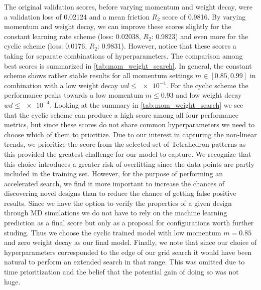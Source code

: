 The original validation scores, before varying momentum and weight decay, were a
validation loss of 0.02124 and a mean friction $R_2$ score of 0.9816. By varying
momentum and weight decay, we can improve these scores slightly for the constant
learning rate scheme (loss: 0.02038, $R_2$: 0.9823) and even more for the cyclic
scheme (loss: 0.0176, $R_2$: 0.9831). However, notice that these scores a taking
for separate combinations of hyperparameters. The comparison among best scores is
summarized in \cref{tab:mom_weight_search}. In general, the constant scheme
shows rather stable results for all momentum settings $m \in [0.85, 0.99]$ in
combination with a low weight decay $wd \le \num{e-4}$. For the cyclic scheme
the performance peaks towards a low momentum $m \le 0.93$ and low weight decay
$wd \le \num{e-4}$. Looking at the summary in \cref{tab:mom_weight_search} we
see that the cyclic scheme can produce a high score among all four
performance metrics, but since these scores do not share common hyperparameters we need to choose which of them to prioritize. Due to our interest in capturing the non-linear trends, we prioritize the score from the
selected set of Tetrahedron patterns as this provided the greatest challenge for our model to capture. We recognize that this choice introduces a greater risk of
overfitting since the data points are partly included in the training set. However, for the purpose of performing an accelerated search, we find it more important to increase the chances of discovering novel designs than to reduce the chance of getting false positive results. Since we have the option to verify the properties of a given design through \acrshort{MD} simulations we do not have to rely on the machine learning prediction as a final score but only as a proposal for configurations worth further studing. Thus we choose the cyclic trained model with low momentum $m = 0.85$ and zero weight decay as our final model. Finally, we note that since our choice of hyperparameters corresponded to the edge of our grid search it would have been natural to perform an extended search in that range. This was omitted due to time prioritization and the belief that the potential gain of doing so was not huge.


